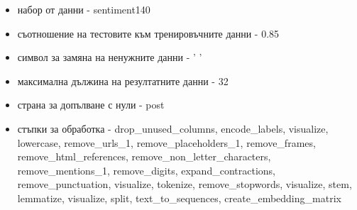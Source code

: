 \documentclass{article}
\begin{document}
\begin{itemize}
\begin{itemize}
\item набор от данни - sentiment140
\item съотношение на тестовите към тренировъчните данни - 0.85
\item символ за замяна на ненужните данни - ' '
\item максимална дължина на резултатните данни - 32
\item страна за допълване с нули - post
\item стъпки за обработка - drop\_unused\_columns, encode\_labels, visualize, lowercase, remove\_urls\_1,
remove\_placeholders\_1, remove\_frames, remove\_html\_references, remove\_non\_letter\_characters,
remove\_mentions\_1, remove\_digits, expand\_contractions, remove\_punctuation, visualize, tokenize,
remove\_stopwords, visualize, stem, lemmatize, visualize, split, text\_to\_sequences, create\_embedding\_matrix
\end{itemize}


\end{itemize}
\end{document}
